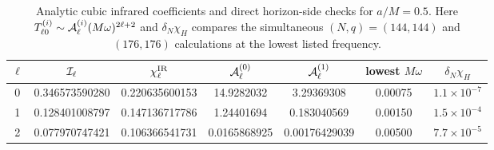 \documentclass[aps,prd,twocolumn,10pt,nofootinbib,superscriptaddress,floatfix]{revtex4-2}
\begin{document}
\begin{table}[t]
\caption{Analytic cubic infrared coefficients and direct horizon-side checks
for $a/M=0.5$.  Here
$T^{(i)}_{\ell0}\sim{\cal A}^{(i)}_\ell(M\omega)^{2\ell+2}$ and
$\delta_N\chi_H$ compares the simultaneous $(N,q)=(144,144)$ and
$(176,176)$ calculations at the lowest listed frequency.}
\label{tab:axisymmetric-infrared}
\begin{ruledtabular}
\begin{tabular}{c c c c c c c}
$\ell$ & ${\cal I}_\ell$ & $\chi^{\rm IR}_\ell$
& ${\cal A}^{(0)}_\ell$ & ${\cal A}^{(1)}_\ell$
& lowest $M\omega$ & $\delta_N\chi_H$\\
\hline
0 & 0.346573590280 & 0.220635600153 & 14.9282032 & 3.29369308 & 0.00075 & $1.1\times10^{-7}$\\
1 & 0.128401008797 & 0.147136717786 & 1.24401694 & 0.183040569 & 0.00150 & $1.5\times10^{-4}$\\
2 & 0.077970747421 & 0.106366541731 & 0.0165868925 & 0.00176429039 & 0.00500 & $7.7\times10^{-5}$\\
\end{tabular}
\end{ruledtabular}
\end{table}
\end{document}
